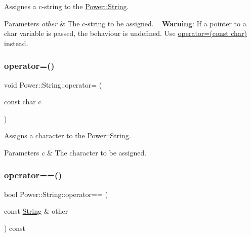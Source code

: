 Assignes a c-\/string to the \hyperlink{class_power_1_1_string}{Power\+::\+String}. 


\begin{DoxyParams}{Parameters}
{\em other} & The c-\/string to be assigned. ~\newline
 {\bfseries Warning}\+: If a pointer to a char variable is passed, the behaviour is undefined. Use \hyperlink{class_power_1_1_string_afca363999008481eb546192d24f8c9c1}{operator=(const char)} instead. \\
\hline
\end{DoxyParams}
\mbox{\label{class_power_1_1_string_afca363999008481eb546192d24f8c9c1}} 
\subsubsection{\texorpdfstring{operator=()}{operator=()}\hspace{0.1cm}{\footnotesize\ttfamily [3/3]}}
{\footnotesize\ttfamily void Power\+::\+String\+::operator= (\begin{DoxyParamCaption}\item[{const char}]{c }\end{DoxyParamCaption})\hspace{0.3cm}{\ttfamily [inline]}}



Assigns a character to the \hyperlink{class_power_1_1_string}{Power\+::\+String}. 


\begin{DoxyParams}{Parameters}
{\em c} & The character to be assigned. \\
\hline
\end{DoxyParams}
\mbox{\label{class_power_1_1_string_ae4616e12ee74fcb4f86ffaa15560854b}} 
\subsubsection{\texorpdfstring{operator==()}{operator==()}\hspace{0.1cm}{\footnotesize\ttfamily [1/3]}}
{\footnotesize\ttfamily bool Power\+::\+String\+::operator== (\begin{DoxyParamCaption}\item[{const \hyperlink{class_power_1_1_string}{String} \&}]{other }\end{DoxyParamCaption}) const\hspace{0.3cm}{\ttfamily [inline]}}



